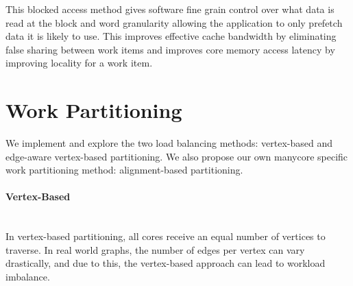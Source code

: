 This blocked access method gives software fine grain control over what data is read at the block and word granularity allowing the application to only prefetch data it is likely to use. 
This improves effective cache bandwidth by eliminating false sharing between work items and improves core memory access latency by improving locality for a work item.



\section{Work Partitioning} \label{sec:method:sub:edge-aware-partitioning}


We implement and explore the two load balancing methods: vertex-based and edge-aware vertex-based partitioning. We also propose our own manycore specific work partitioning method: alignment-based partitioning. 

\paragraph{Vertex-Based}\mbox{}\\
In vertex-based partitioning, all cores receive an equal number of vertices to traverse. 
In real world graphs, the number of edges per vertex can vary drastically, and due to this, the vertex-based approach can lead to workload imbalance. 

